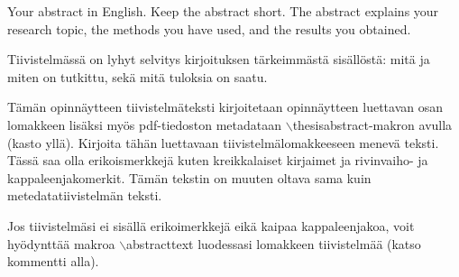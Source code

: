 \documentclass[english, 12pt, a4paper, sci, utf8, a-1b, online]{aaltothesis}
\date{14.10.2020}
\begin{document}
\makecoverpage{}

\makecopyrightpage{}


\begin{abstractpage}[english]
Your abstract in English. Keep the abstract short. The abstract explains your
research topic, the methods you have used, and the results you obtained.
\end{abstractpage}

\newpage




\begin{abstractpage}[finnish]
Tiivistelmässä on lyhyt selvitys kirjoituksen tärkeimmästä sisällöstä: mitä ja
miten on tutkittu, sekä mitä tuloksia on saatu.

Tämän opinnäytteen tiivistelmäteksti kirjoitetaan opinnäytteen luettavan osan 
lomakkeen lisäksi myös pdf-tiedoston metadataan 
$\backslash$thesisabstract-makron avulla (kasto yllä). Kirjoita tähän
luettavaan tiivistelmälomakkeeseen menevä teksti. Tässä saa olla erikoismerkkejä
kuten kreikkalaiset kirjaimet ja rivinvaiho- ja kappaleenjakomerkit. Tämän
tekstin on muuten oltava sama kuin metedatatiivistelmän teksti.

Jos tiivistelmäsi ei sisällä erikoimerkkejä eikä kaipaa kappaleenjakoa, voit
hyödynttää makroa $\backslash$abstracttext luodessasi lomakkeen tiivistelmää
(katso kommentti alla).

\end{abstractpage}


\end{document}
